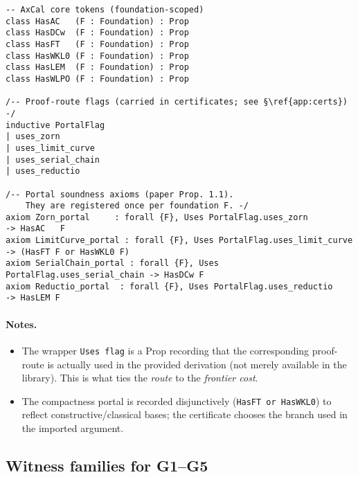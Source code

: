 \documentclass[11pt]{article}
\theoremstyle{definition}
\theoremstyle{remark}
\begin{document}
\begin{verbatim}
-- AxCal core tokens (foundation-scoped)
class HasAC   (F : Foundation) : Prop
class HasDCw  (F : Foundation) : Prop
class HasFT   (F : Foundation) : Prop
class HasWKL0 (F : Foundation) : Prop
class HasLEM  (F : Foundation) : Prop
class HasWLPO (F : Foundation) : Prop

/-- Proof-route flags (carried in certificates; see §\ref{app:certs}) -/
inductive PortalFlag
| uses_zorn
| uses_limit_curve
| uses_serial_chain
| uses_reductio

/-- Portal soundness axioms (paper Prop. 1.1). 
    They are registered once per foundation F. -/
axiom Zorn_portal     : forall {F}, Uses PortalFlag.uses_zorn         -> HasAC   F
axiom LimitCurve_portal : forall {F}, Uses PortalFlag.uses_limit_curve -> (HasFT F or HasWKL0 F)
axiom SerialChain_portal : forall {F}, Uses PortalFlag.uses_serial_chain -> HasDCw F
axiom Reductio_portal  : forall {F}, Uses PortalFlag.uses_reductio     -> HasLEM F
\end{verbatim}

\paragraph{Notes.}
\begin{itemize}
\item The wrapper \verb|Uses flag| is a Prop recording that the corresponding proof-route is actually used in the provided derivation (not merely available in the library). This is what ties the \emph{route} to the \emph{frontier cost}.
\item The compactness portal is recorded disjunctively (\verb|HasFT or HasWKL0|) to reflect constructive/classical bases; the certificate chooses the branch used in the imported argument.
\end{itemize}

\subsection{Witness families for G1--G5}\label{app:witnesses}
\end{document}
